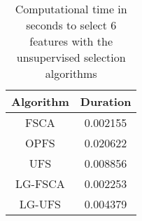 \begin{table}
	\begin{center}
		\begin{tabular}{c c}
			Algorithm & Duration \\
			\hline
			FSCA & 0.002155 \\
			OPFS & 0.020622 \\
			UFS & 0.008856 \\
			LG-FSCA & 0.002253 \\
			LG-UFS & 0.004379 \\
		\end{tabular}
	\end{center}
	\caption{Computational time in seconds to select 6 features with the unsupervised selection algorithms}
\end{table}